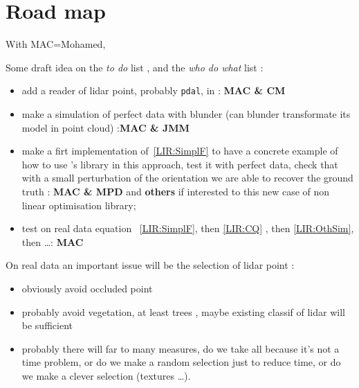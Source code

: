 \section{Road map}

With MAC=Mohamed,

Some draft idea on the \emph{to do} list , and the  \emph{who do what} list :

\begin{itemize}
    \item  add a reader of lidar point, probably {\tt pdal}, in \PPP  :  {\bf MAC \& CM}

    \item  make a simulation of perfect data with blunder  (can blunder transformate its model in point cloud) :{\bf MAC \& JMM}

    \item make a firt implementation of~\ref{LIR:SimplF} to have a concrete example of 
         how to use  \PPP's library in this approach, test it with perfect data, check that  with
         a small perturbation of the orientation we are able to recover the ground truth :
         {\bf  MAC \& MPD} and {\bf  others} if interested to this new case of non linear optimisation library;

    \item test on real data equation ~\ref{LIR:SimplF}, then \ref{LIR:CQ} , then \ref{LIR:OthSim}, then \dots  : {\bf MAC} 
\end{itemize}

On real data an important issue will be  the selection of lidar point  : 

\begin{itemize}
     \item  obviously  avoid occluded point
     \item  probably   avoid vegetation, at least trees , maybe existing classif of lidar will be sufficient
     \item  probably there will far to many measures,  do we take all because it's not a time problem, 
            or do we make a random selection just to reduce time, or do we make a clever selection (textures \dots).
\end{itemize}










